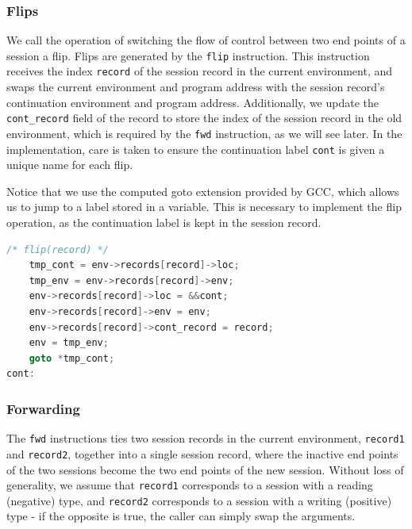 
\subsubsection{Flips}

We call the operation of switching the flow of control between two end points of a session a flip. Flips are generated by the \texttt{flip} instruction. This instruction receives the index \texttt{record} of the session record in the current environment, and swaps the current environment and program address with the session record's continuation environment and program address. Additionally, we update the \texttt{cont\_record} field of the record to store the index of the session record in the old environment, which is required by the \texttt{fwd} instruction, as we will see later. In the implementation, care is taken to ensure the continuation label \texttt{cont} is given a unique name for each flip.

Notice that we use the computed goto extension provided by GCC, which allows us to jump to a label stored in a variable. This is necessary to implement the flip operation, as the continuation label is kept in the session record.

\begin{lstlisting}[language=C]
    /* flip(record) */
    tmp_cont = env->records[record]->loc;
    tmp_env = env->records[record]->env;
    env->records[record]->loc = &&cont;
    env->records[record]->env = env;
    env->records[record]->cont_record = record;
    env = tmp_env;
    goto *tmp_cont;
cont:
\end{lstlisting}

\subsubsection{Forwarding}

The \texttt{fwd} instructions ties two session records in the current environment, \texttt{record1} and \texttt{record2}, together into a single session record, where the inactive end points of the two sessions become the two end points of the new session. Without loss of generality, we assume that \texttt{record1} corresponds to a session with a reading (negative) type, and \texttt{record2} corresponds to a session with a writing (positive) type - if the opposite is true, the caller can simply swap the arguments.

